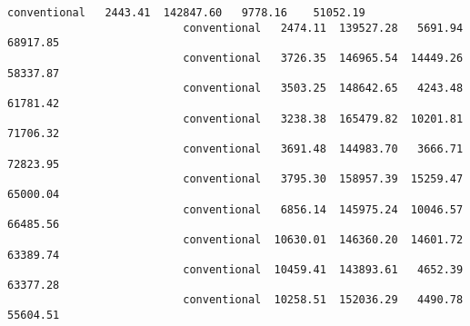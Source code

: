 \documentclass[11pt]{article}
\begin{document}
\begin{Verbatim}[commandchars=\\\{\}]
                           conventional   2443.41  142847.60   9778.16    51052.19   
                           conventional   2474.11  139527.28   5691.94    68917.85   
                           conventional   3726.35  146965.54  14449.26    58337.87   
                           conventional   3503.25  148642.65   4243.48    61781.42   
                           conventional   3238.38  165479.82  10201.81    71706.32   
                           conventional   3691.48  144983.70   3666.71    72823.95   
                           conventional   3795.30  158957.39  15259.47    65000.04   
                           conventional   6856.14  145975.24  10046.57    66485.56   
                           conventional  10630.01  146360.20  14601.72    63389.74   
                           conventional  10459.41  143893.61   4652.39    63377.28   
                           conventional  10258.51  152036.29   4490.78    55604.51   
          

\end{Verbatim}
\end{document}
